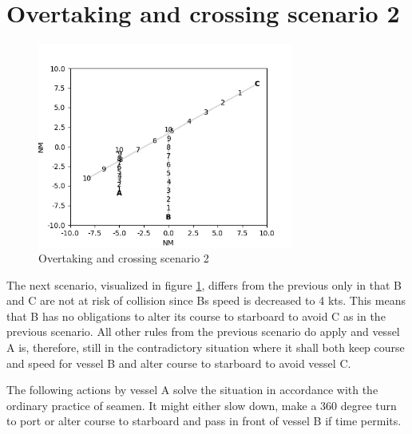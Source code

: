 \section{Overtaking and crossing scenario 2}%


\begin{figure}[H]
    \centering
    \includegraphics[width=0.75\textwidth,height=0.75\textheight,keepaspectratio]{../src/img/overtaking_crossing_3.png}
    \caption{Overtaking and crossing scenario 2 \cite{ecolreg_overtaking-and-crossing-3}}
    \label{fig:overtaking-and-crossing-3}
\end{figure}
The next scenario, visualized in figure \ref{fig:overtaking-and-crossing-3}, differs from the previous only in that B and C are not at risk of collision since Bs speed is decreased to 4 kts. This means that B has no obligations to alter its course to starboard to avoid C as in the previous scenario. All other rules from the previous scenario do apply and vessel A is, therefore, still in the contradictory situation where it shall both keep course and speed for vessel B and alter course to starboard to avoid vessel C.

The following actions by vessel A solve the situation in accordance with the ordinary practice of seamen. It might either slow down, make a 360 degree turn to port or alter course to starboard and pass in front of vessel B if time permits.



